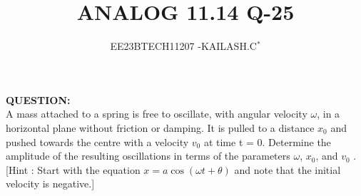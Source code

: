 \documentclass[journal,12pt,twocolumn]{IEEEtran}
\theoremstyle{remark}
\begin{document}

\vspace{3cm}

\title{ANALOG 11.14 Q-25}
\author{EE23BTECH11207 -KAILASH.C$^{*}$%
}
\maketitle
\newpage
\bigskip

\renewcommand{\thefigure}{\theenumi}
\renewcommand{\thetable}{\theenumi}
\textbf{QUESTION:}\\
A mass attached to a spring is free to oscillate, with angular velocity $\omega$, in a horizontal
plane without friction or damping. It is pulled to a distance $x_0$
 and pushed towards
the centre with a velocity $v_0$
 at time t = 0. Determine the amplitude of the resulting
oscillations in terms of the parameters $\omega{}$, $x_0$,
 and $v_0$
. [Hint : Start with the equation
$x = a \cos(\omega{t}+\theta{})$ and note that the initial velocity is negative.]\\
\end{document}
